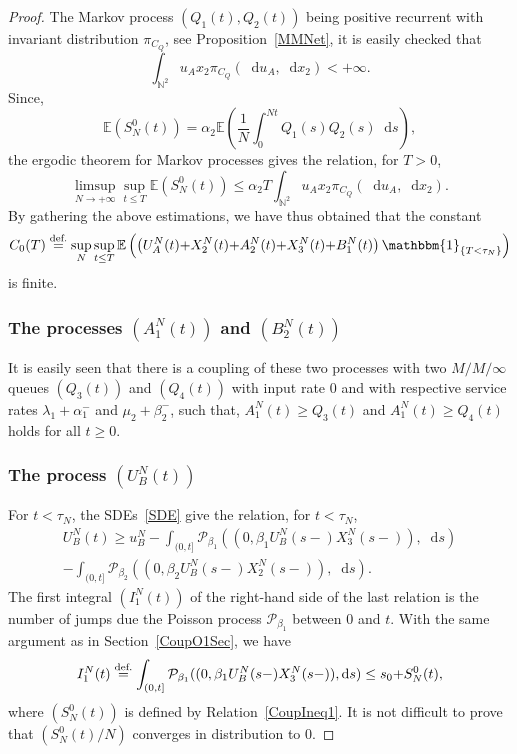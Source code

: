 \documentclass[english]{amsart}
\newcommand{\N}{\ensuremath{\mathbb{N}}}
\newcommand{\E}{\ensuremath{\mathbb{E}}}
\newcommand{\ind}[1]{\ensuremath{\mathbbm{1}_{\left\{#1\right\}}}}
\newcommand{\diff}{\mathop{}\mathopen{}\mathrm{d}}
\newcommand{\cal}[1]{\ensuremath{\mathcal{#1}}}
\newcommand\steq[1]{\stackrel{\text{\rm #1.}}{=}}
\numberwithin{proposition}{section}
\begin{document}
\begin{proof}
The Markov process  $(Q_1(t),Q_2(t))$ being positive recurrent with invariant distribution $\pi_{C_Q}$, see Proposition~\ref{MMNet}, it is easily checked that
\[
\int_{\N^2}u_Ax_2\pi_{C_Q}(\diff u_A,\diff x_2) < {+}\infty.
\]
Since,
\[
\E\left(S_N^0(t)\right)=\alpha_2\E\left(\frac{1}{N}\int_0^{Nt}Q_1(s)Q_2(s)\diff s\right),
\]
the ergodic theorem for Markov processes gives the relation, for $T{>}0$, 
\[
\limsup_{N\to+\infty} \sup_{t\le T} \E\left(S_N^0(t)\right)\le\alpha_2T\int_{\N^2}u_Ax_2\pi_{C_Q}(\diff u_A,\diff x_2).
\]
By gathering the above estimations, we  have thus obtained that the constant
\begin{equation}\label{CoupO1Eq}
C_0(T)\steq{def}\sup_{N}\sup_{t\leq T} \E\left(\left(U_A^N(t){+}X_2^N(t){+}A_2^N(t){+}X_3^N(t){+}B_1^N(t)\right) \ind{T<\tau_N}\right) 
\end{equation}
is finite. 
\subsubsection{The processes $(A_1^N(t))$ and $(B_2^N(t))$}\label{CoupA1Sec}
It is easily seen that there is a coupling of these two processes with two $M/M/\infty$ queues $(Q_3(t))$ and $(Q_4(t))$ with input rate $0$ and with respective service rates  $\lambda_1{+}\alpha_1^-$ and $\mu_2{+}\beta_2^-$, such that, $A_1^N(t){\ge}Q_3(t)$ and $A_1^N(t)\ge Q_4(t)$ holds for all $t{\ge}0$. 
\subsubsection{The process $(U_B^N(t))$}
For $t{<}\tau_N$, the SDEs~\eqref{SDE} give the relation, for $t{<}\tau_N$,
\begin{multline}\label{EqCoupUB}
U_B^N(t) \ge u_B^N-\int_{(0,t]}{\cal P}_{\beta_1}((0, \beta_1U_B^N(s{-})  X_3^N(s{-})),\diff s)\\
-\int_{(0,t]}{\cal P}_{\beta_2}\left(\left(0,\beta_2U_B^N(s{-}) X_2^N(s{-})\right),\diff s\right).
\end{multline}
The first integral $(I_1^N(t))$ of the right-hand side of the last relation is the number of jumps due the Poisson process ${\cal P}_{\beta_1}$ between $0$ and $t$. With the same argument as in Section~\ref{CoupO1Sec}, we have
\[
I_1^N(t)\steq{def}\int_{(0,t]}{\cal P}_{\beta_1}((0, \beta_1U_B^N(s{-})  X_3^N(s{-})),\diff s)\le s_0{+}  S_N^0(t),
  \]
  where $(S_N^0(t))$  is defined by Relation~\eqref{CoupIneq1}.
  It is not difficult to prove that $(S_N^0(t)/N)$ converges in distribution to $0$.


\end{proof}
\end{document}
